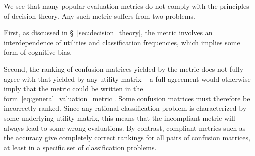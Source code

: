 \documentclass[\ifafour a4paper,12pt,\else a5paper,10pt,\fi%
onecolumn,oneside,article,%
british%
]{memoir}
\theoremstyle{remark}
\theoremstyle{innote}
\renewcommand*{\|}[1][]{\nonscript\:#1\vert\nonscript\:\mathopen{}}
\newcommand*{\sect}{\S}%
\begin{document}
We see that many popular evaluation metrics do not comply with the principles of decision theory. Any such metric suffers from two problems.

First, as discussed in \sect~\ref{sec:decision_theory}, the metric involves an interdependence of utilities and classification frequencies, which implies some form of cognitive bias\autocites[discuss such biases regarding the $F_{1}$-measure]{handetal2018}.

Second, the ranking of confusion matrices yielded by the metric does not fully agree with that yielded by any utility matrix -- a full agreement would otherwise imply that the metric could be written in the form~\eqref{eq:general_valuation_metric}. Some confusion matrices must therefore be incorrectly ranked. Since any rational classification problem is characterized by some underlying utility matrix, this means that the incompliant metric will always lead to some wrong evaluations. By contrast, compliant metrics such as the accuracy give completely correct rankings for all pairs of confusion matrices, at least in a specific set of classification problems.
\end{document}
